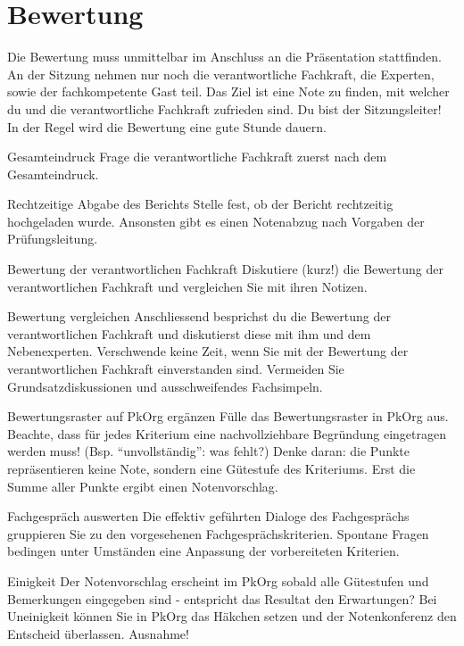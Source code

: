 \section{Bewertung}
Die Bewertung muss unmittelbar im Anschluss an die Präsentation stattfinden. An der Sitzung
nehmen nur noch die verantwortliche Fachkraft, die Experten, sowie der fachkompetente Gast teil. Das Ziel ist eine Note zu finden, mit welcher du und die verantwortliche Fachkraft zufrieden sind. Du bist der Sitzungsleiter! In der Regel wird die Bewertung eine gute Stunde dauern.

\begin{taskitem}{Gesamteindruck}
  Frage die verantwortliche Fachkraft zuerst nach dem Gesamteindruck.
\end{taskitem}
\begin{taskitem}{Rechtzeitige Abgabe des Berichts}
  Stelle fest, ob der Bericht rechtzeitig hochgeladen wurde. Ansonsten gibt es einen Notenabzug nach Vorgaben der Prüfungsleitung.
\end{taskitem}
\begin{taskitem}{Bewertung der verantwortlichen Fachkraft}
  Diskutiere (kurz!) die Bewertung der verantwortlichen Fachkraft und vergleichen Sie mit ihren Notizen.
\end{taskitem}
\begin{taskitem}{Bewertung vergleichen}
  Anschliessend besprichst du die Bewertung der verantwortlichen Fachkraft und diskutierst diese mit ihm und dem Nebenexperten. Verschwende keine Zeit, wenn Sie mit der Bewertung der verantwortlichen Fachkraft einverstanden sind. Vermeiden Sie Grundsatzdiskussionen und ausschweifendes Fachsimpeln.
\end{taskitem}
\begin{taskitem}{Bewertungsraster auf PkOrg ergänzen}
  Fülle das Bewertungsraster in PkOrg aus. Beachte, dass für jedes Kriterium eine nachvollziehbare Begründung eingetragen werden muss! (Bsp. \enquote{unvollständig}: was fehlt?) Denke daran: die Punkte repräsentieren keine Note, sondern eine Gütestufe des Kriteriums. Erst die Summe aller Punkte ergibt einen Notenvorschlag.
\end{taskitem}
\begin{taskitem}{Fachgespräch auswerten}
  Die effektiv geführten Dialoge des Fachgesprächs gruppieren Sie zu den vorgesehenen Fachgesprächskriterien. Spontane Fragen bedingen unter Umständen eine Anpassung der vorbereiteten Kriterien.
\end{taskitem}
\begin{taskitem}{Einigkeit}
  Der Notenvorschlag erscheint im PkOrg sobald alle Gütestufen und Bemerkungen eingegeben sind - entspricht das Resultat den Erwartungen? Bei Uneinigkeit können Sie in PkOrg das Häkchen setzen und der Notenkonferenz den Entscheid überlassen. Ausnahme!
\end{taskitem}
